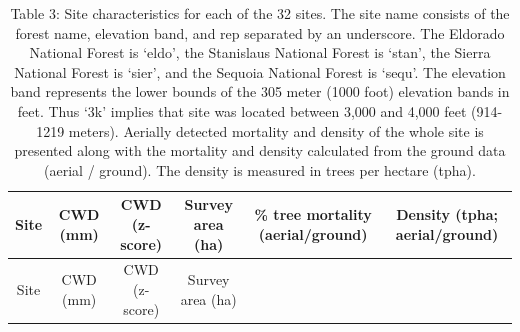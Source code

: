 \documentclass[]{article}
\begin{document}
\begin{longtable}[]{@{}cccccc@{}}
\caption{Table 3: Site characteristics for each of the 32 sites. The
site name consists of the forest name, elevation band, and rep separated
by an underscore. The Eldorado National Forest is `eldo', the Stanislaus
National Forest is `stan', the Sierra National Forest is `sier', and the
Sequoia National Forest is `sequ'. The elevation band represents the
lower bounds of the 305 meter (1000 foot) elevation bands in feet. Thus
`3k' implies that site was located between 3,000 and 4,000 feet
(914-1219 meters). Aerially detected mortality and density of the whole
site is presented along with the mortality and density calculated from
the ground data (aerial / ground). The density is measured in trees per
hectare (tpha).}\tabularnewline
\toprule
\begin{minipage}[b]{0.11\columnwidth}\centering\strut
Site\strut
\end{minipage} & \begin{minipage}[b]{0.07\columnwidth}\centering\strut
CWD (mm)\strut
\end{minipage} & \begin{minipage}[b]{0.11\columnwidth}\centering\strut
CWD (z-score)\strut
\end{minipage} & \begin{minipage}[b]{0.13\columnwidth}\centering\strut
Survey area (ha)\strut
\end{minipage} & \begin{minipage}[b]{0.18\columnwidth}\centering\strut
\% tree mortality (aerial/ground)\strut
\end{minipage} & \begin{minipage}[b]{0.22\columnwidth}\centering\strut
Density (tpha; aerial/ground)\strut
\end{minipage}\tabularnewline
\midrule
\endfirsthead
\toprule
\begin{minipage}[b]{0.11\columnwidth}\centering\strut
Site\strut
\end{minipage} & \begin{minipage}[b]{0.07\columnwidth}\centering\strut
CWD (mm)\strut
\end{minipage} & \begin{minipage}[b]{0.11\columnwidth}\centering\strut
CWD (z-score)\strut
\end{minipage} & \begin{minipage}[b]{0.13\columnwidth}\centering\strut
Survey area (ha)\strut
\end{minipage} & \begin{minipage}[b]{0.18\columnwidth}\centering\strut

\end{minipage}
\end{longtable}
\end{document}
